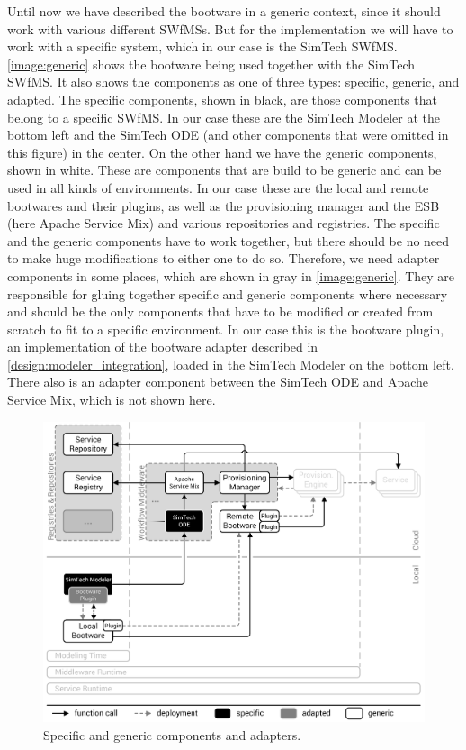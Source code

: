 Until now we have described the bootware in a generic context, since it should work with various different SWfMSs.
But for the implementation we will have to work with a specific system, which in our case is the SimTech SWfMS.
\autoref{image:generic} shows the bootware being used together with the SimTech SWfMS.
It also shows the components as one of three types: specific, generic, and adapted.
The specific components, shown in black, are those components that belong to a specific SWfMS.
In our case these are the SimTech Modeler at the bottom left and the SimTech ODE (and other components that were omitted in this figure) in the center.
On the other hand we have the generic components, shown in white.
These are components that are build to be generic and can be used in all kinds of environments.
In our case these are the local and remote bootwares and their plugins, as well as the provisioning manager and the ESB (here Apache Service Mix) and various repositories and registries.
The specific and the generic components have to work together, but there should be no need to make huge modifications to either one to do so.
Therefore, we need adapter components in some places, which are shown in gray in \autoref{image:generic}.
They are responsible for gluing together specific and generic components where necessary and should be the only components that have to be modified or created from scratch to fit to a specific environment.
In our case this is the bootware plugin, an implementation of the bootware adapter described in \autoref{design:modeler_integration}, loaded in the SimTech Modeler on the bottom left.
There also is an adapter component between the SimTech ODE and Apache Service Mix, which is not shown here.

\begin{figure}[!htbp]
	\centering
	\includegraphics[resolution=600]{implementation/assets/generic}
	\caption{Specific and generic components and adapters.}
	\label{image:generic}
\end{figure}

